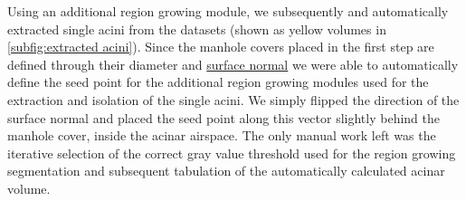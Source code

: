 \documentclass[%
	paper=a4,%
	abstract=true,%
	]{scrartcl}
\begin{document}
Using an additional region growing module, we subsequently and automatically extracted single acini from the datasets (shown as yellow volumes in \autoref{subfig:extracted acini}). Since the manhole covers placed in the first step are defined through their diameter and \href{https://secure.wikimedia.org/wikipedia/en/w/index.php?title=Surface_normal&oldid=411684319}{surface normal} we were able to automatically define the seed point for the additional region growing modules used for the extraction and isolation of the single acini. We simply flipped the direction of the surface normal and placed the seed point along this vector slightly behind the manhole cover, inside the acinar airspace. The only manual work left was the iterative selection of the correct gray value threshold used for the region growing segmentation and subsequent tabulation of the automatically calculated acinar volume.
\end{document}
